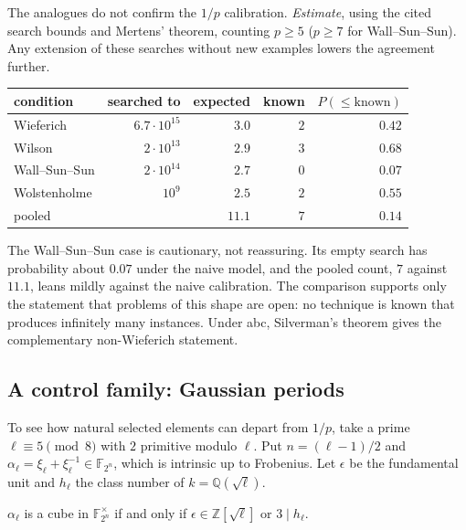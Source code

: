 The analogues do not confirm the $1/p$ calibration.  \emph{Estimate}, using
the cited search bounds and Mertens' theorem, counting $p\geq5$ ($p\geq7$
for Wall--Sun--Sun).  Any extension of these searches without new examples
lowers the agreement further.
\begin{center}
\small
\begin{tabular}{lrrrr}
\hline
condition & searched to & expected & known & $P(\leq\text{known})$\\
\hline
Wieferich \cite{crandalldilcherpomerance1997,doraisklyve2011} &
  $6.7\cdot10^{15}$ & $3.0$ & $2$ & $0.42$\\
Wilson \cite{costagerbiczharvey2014} & $2\cdot10^{13}$ & $2.9$ & $3$ & $0.68$\\
Wall--Sun--Sun \cite{sunsun1992,mcintoshroettger2007} &
  $2\cdot10^{14}$ & $2.7$ & $0$ & $0.07$\\
Wolstenholme \cite{mcintosh1995,mcintoshroettger2007} & $10^9$ & $2.5$ & $2$ & $0.55$\\
\hline
pooled & & $11.1$ & $7$ & $0.14$\\
\hline
\end{tabular}
\end{center}
The Wall--Sun--Sun case is cautionary, not reassuring.  Its empty search has
probability about $0.07$ under the naive model, and the pooled count, $7$
against $11.1$, leans mildly against the naive calibration.  The comparison
supports only the statement that problems of this shape are open: no
technique is known that produces infinitely many instances.  Under abc,
Silverman's theorem \cite{silverman1988} gives the complementary
non-Wieferich statement.

\subsection{A control family: Gaussian periods}\label{sec:model-control}

To see how natural selected elements can depart from $1/p$, take a prime
$\ell\equiv5\pmod8$ with $2$ primitive modulo $\ell$.  Put $n=(\ell-1)/2$
and $\alpha_\ell=\xi_\ell+\xi_\ell^{-1}\in\mathbb F_{2^n}$, which is
intrinsic up to Frobenius.  Let $\epsilon$ be the fundamental unit and
$h_\ell$ the class number of $k=\mathbb Q(\sqrt\ell)$.

\begin{proposition}\label{prop:model-gauss}
$\alpha_\ell$ is a cube in $\mathbb F_{2^n}^{\times}$ if and only if
$\epsilon\in\mathbb Z[\sqrt\ell]$ or $3\mid h_\ell$.
\end{proposition}

